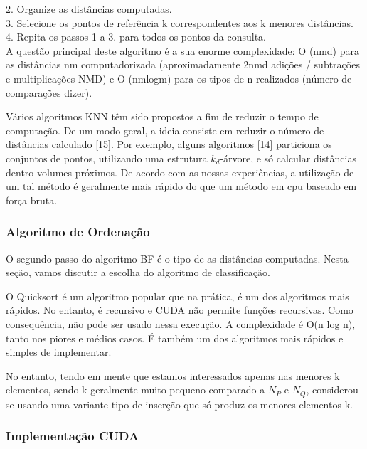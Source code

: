 \documentclass[letterpaper, 10 pt, conference]{ieeeconf}  %
\begin{document}
2. Organize as distâncias computadas.\\

3. Selecione os pontos de referência k correspondentes aos k menores distâncias.\\

4. Repita os passos 1 a 3. para todos os pontos da consulta.\\

A questão principal deste algoritmo é a sua enorme complexidade: O (nmd) para as
distâncias nm computadorizada (aproximadamente 2nmd adições / subtrações e
multiplicações NMD) e O (nmlogm) para os tipos de n realizados (número de
comparações dizer).

Vários algoritmos KNN têm sido propostos a fim de reduzir o tempo de computação.
De um modo geral, a ideia consiste em reduzir o número de distâncias calculado
[15]. Por exemplo, alguns algoritmos [14] particiona os conjuntos de pontos,
utilizando uma estrutura $k_d$-árvore, e só calcular distâncias dentro volumes
próximos. De acordo com as nossas experiências, a utilização de um tal método é
geralmente mais rápido do que um método em cpu baseado em força bruta.\\

\subsubsection{Algoritmo de Ordenação}

O segundo passo do algoritmo BF é o tipo de as distâncias computadas. Nesta
seção, vamos discutir a escolha do algoritmo de classificação.

O Quicksort é um algoritmo popular que na prática, é um dos algoritmos mais
rápidos. No entanto, é recursivo e CUDA não permite funções recursivas. Como
consequência, não pode ser usado nessa execução. A complexidade é O(n log n),
tanto nos piores e médios casos. É também um dos algoritmos mais rápidos e
simples de implementar.

No entanto, tendo em mente que estamos interessados apenas nas menores k
elementos, sendo k geralmente muito pequeno comparado a $N_P$ e $N_Q$,
considerou-se usando uma variante tipo de inserção que só produz os menores
elementos k.\\

\subsubsection{Implementação CUDA}
\end{document}
